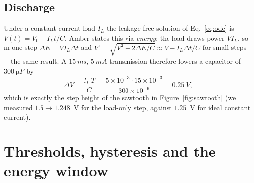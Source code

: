 \subsection{Discharge}
Under a constant-current load $I_L$ the leakage-free solution of Eq.~\eqref{eq:ode} is
$V(t)=V_0-I_Lt/C$. Amber states this via \emph{energy}: the load draws power $VI_L$,
so in one step $\Delta E=VI_L\Delta t$ and $V'=\sqrt{V^2-2\Delta E/C}\approx V-I_L\Delta t/C$ for small steps---the same result. A $\SI{15}{ms}$, $\SI{5}{mA}$ transmission therefore
lowers a capacitor of $\SI{300}{\micro F}$ by
\[
 \Delta V=\frac{I_L\,T}{C}=\frac{5\times10^{-3}\cdot15\times10^{-3}}{300\times10^{-6}}=\SI{0.25}{V},
\]
which is exactly the step height of the sawtooth in Figure~\ref{fig:sawtooth} (we measured $1.5\to1.248$~V
for the load-only step, against $1.25$~V for ideal constant current).

\section{Thresholds, hysteresis and the energy window}
\label{sec:hysteresis}

